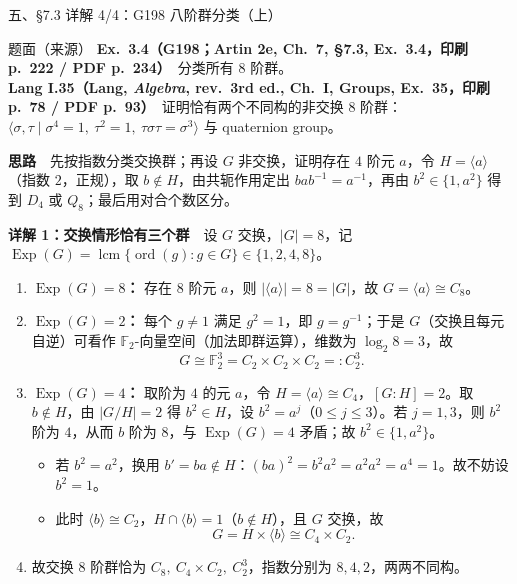 \documentclass[aspectratio=169,10pt,fontset=none]{ctexbeamer}
\newcommand{\ex}[1]{\textcolor{accent}{\footnotesize\bfseries #1}}
\newcommand{\key}[1]{\textcolor{ink}{\bfseries #1}}
\begin{document}
\begin{frame}[t]{五、\S7.3 详解 4/4：G198 八阶群分类（上）}
\label{ex:G198}
\begin{block}{\footnotesize 题面（来源）}
\scriptsize
\textbf{Ex.~3.4（\ex{G198}；Artin 2e, Ch.~7, \S7.3, Ex.~3.4，印刷 p.~222 / PDF p.~234）}\ 
分类所有 $8$ 阶群。\\
\textbf{Lang I.35（Lang, \emph{Algebra}, rev.\ 3rd ed., Ch.~I, Groups, Ex.~35，印刷 p.~78 / PDF p.~93）}\ 
证明恰有两个不同构的非交换 $8$ 阶群：$\langle\sigma,\tau\mid\sigma^4=1,\ \tau^2=1,\ \tau\sigma\tau=\sigma^3\rangle$ 与 quaternion group。
\end{block}
{\footnotesize\key{思路}\ \ 先按指数分类交换群；再设 $G$ 非交换，证明存在 $4$ 阶元 $a$，令 $H=\langle a\rangle$（指数 $2$，正规），取 $b\notin H$，由共轭作用定出 $bab^{-1}=a^{-1}$，再由 $b^2\in\{1,a^2\}$ 得到 $D_4$ 或 $Q_8$；最后用对合个数区分。\par}
{\footnotesize\key{详解 1：交换情形恰有三个群}\ \ 设 $G$ 交换，$|G|=8$，记 $\operatorname{Exp}(G)=\operatorname{lcm}\{\operatorname{ord}(g):g\in G\}\in\{1,2,4,8\}$。\par}
\begin{enumerate}\setlength{\itemsep}{1pt}
\scriptsize
\item \textbf{$\operatorname{Exp}(G)=8$：} 存在 $8$ 阶元 $a$，则 $|\langle a\rangle|=8=|G|$，故 $G=\langle a\rangle\cong C_8$。
\item \textbf{$\operatorname{Exp}(G)=2$：} 每个 $g\neq1$ 满足 $g^2=1$，即 $g=g^{-1}$；于是 $G$（交换且每元自逆）可看作 $\mathbb F_2$-向量空间（加法即群运算），维数为 $\log_2 8=3$，故
\[ G\cong\mathbb F_2^3=C_2\times C_2\times C_2=:C_2^3. \]
\item \textbf{$\operatorname{Exp}(G)=4$：} 取阶为 $4$ 的元 $a$，令 $H=\langle a\rangle\cong C_4$，$[G:H]=2$。取 $b\notin H$，由 $|G/H|=2$ 得 $b^2\in H$，设 $b^2=a^j$（$0\le j\le3$）。若 $j=1,3$，则 $b^2$ 阶为 $4$，从而 $b$ 阶为 $8$，与 $\operatorname{Exp}(G)=4$ 矛盾；故 $b^2\in\{1,a^2\}$。
  \begin{itemize}\setlength{\itemsep}{0pt}
  \item 若 $b^2=a^2$，换用 $b'=ba\notin H$：$(ba)^2=b^2a^2=a^2a^2=a^4=1$。故不妨设 $b^2=1$。
  \item 此时 $\langle b\rangle\cong C_2$，$H\cap\langle b\rangle=1$（$b\notin H$），且 $G$ 交换，故
  \[ G=H\times\langle b\rangle\cong C_4\times C_2. \]
  \end{itemize}
\item 故交换 $8$ 阶群恰为 $C_8,\ C_4\times C_2,\ C_2^3$，指数分别为 $8,4,2$，两两不同构。
\end{enumerate}
\end{frame}
\end{document}
